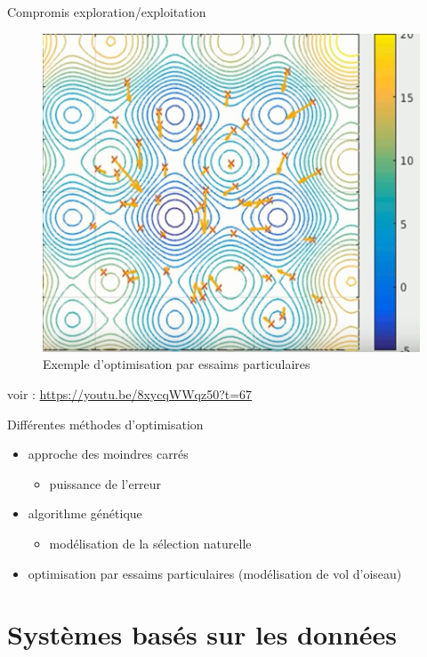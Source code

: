 \documentclass[9pt, aspectratio=169]{beamer}
\begin{document}
\begin{frame}{Compromis exploration/exploitation} %

\begin{figure}
	\includegraphics[width=.5\textwidth]{fig/pso_example.jpg}
	\caption{Exemple d'optimisation par essaims particulaires}
\end{figure}

voir : \url{https://youtu.be/8xycqWWqz50?t=67}
\end{frame}

\begin{frame}{Différentes méthodes d'optimisation} %

\begin{itemize}
	\item approche des moindres carrés
	\begin{itemize}
		\item puissance de l'erreur
	\end{itemize}
	\item algorithme génétique \cite{jillings_automatic_2017}
	\begin{itemize}
		\item modélisation de la sélection naturelle
	\end{itemize}
	\item optimisation par essaims particulaires (modélisation de vol d'oiseau)
\end{itemize}
\end{frame}

\section{Systèmes basés sur les données}
\end{document}
